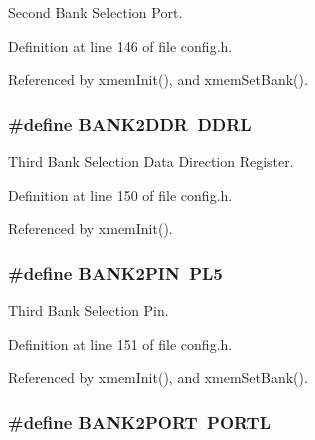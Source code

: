 Second Bank Selection Port. 



Definition at line 146 of file config.\-h.



Referenced by xmem\-Init(), and xmem\-Set\-Bank().

\hypertarget{group__config_ga62f56230c5f5f7220c44ab1c93d677ab}{
\subsubsection[{B\-A\-N\-K2\-D\-D\-R}]{\setlength{\rightskip}{0pt plus 5cm}\#define B\-A\-N\-K2\-D\-D\-R~D\-D\-R\-L}}\label{group__config_ga62f56230c5f5f7220c44ab1c93d677ab}


Third Bank Selection Data Direction Register. 



Definition at line 150 of file config.\-h.



Referenced by xmem\-Init().

\hypertarget{group__config_ga74c95f6ccdb5e482e97a5af53ed74229}{
\subsubsection[{B\-A\-N\-K2\-P\-I\-N}]{\setlength{\rightskip}{0pt plus 5cm}\#define B\-A\-N\-K2\-P\-I\-N~P\-L5}}\label{group__config_ga74c95f6ccdb5e482e97a5af53ed74229}


Third Bank Selection Pin. 



Definition at line 151 of file config.\-h.



Referenced by xmem\-Init(), and xmem\-Set\-Bank().

\hypertarget{group__config_gad35afb0251524c201c2d60f3d035af32}{
\subsubsection[{B\-A\-N\-K2\-P\-O\-R\-T}]{\setlength{\rightskip}{0pt plus 5cm}\#define B\-A\-N\-K2\-P\-O\-R\-T~P\-O\-R\-T\-L}}\label{group__config_gad35afb0251524c201c2d60f3d035af32}


